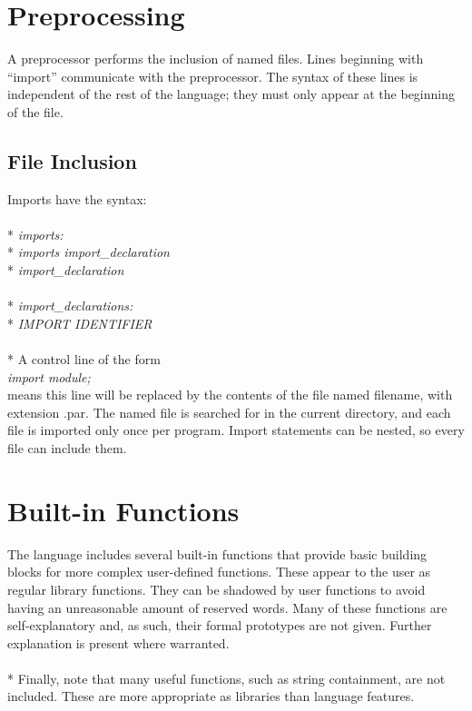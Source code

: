 \section{Preprocessing}
A preprocessor performs the inclusion of named files. Lines beginning with “import” communicate with the preprocessor. The syntax of these lines is independent of the rest of the language; they must only appear at the beginning of the file.

\subsection{File Inclusion}
Imports have the syntax:
\\ \\* \tab \emph{imports:}
\\* \tab \tab \emph{imports import\_declaration}
\\* \tab \tab \emph{import\_declaration}
\\ \\* \tab \emph{import\_declarations:}
\\* \tab \tab \emph{IMPORT IDENTIFIER}
\\ \\* A control line of the form
\\ \tab \emph{import module;}
\\ means this line will be replaced by the contents of the file named filename, with extension .par. The named file is searched for in the current directory, and each file is imported only once per program. Import statements can be nested, so every file can include them.

\section{Built-in Functions}
The language includes several built-in functions that provide basic building blocks for more complex user-defined functions. These appear to the user as regular library functions. They can be shadowed by user functions to avoid having an unreasonable amount of reserved words. Many of these functions are self-explanatory and, as such, their formal prototypes are not given.  Further explanation is present where warranted.
\\ \\* Finally, note that many useful functions, such as string containment, are not included. These are more appropriate as libraries than language features.

